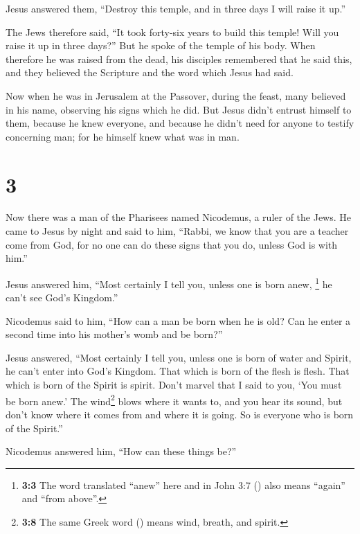  Jesus answered them, ``Destroy this temple, and in three
days I will raise it up.''

 The Jews therefore said, ``It took forty-six years to
build this temple! Will you raise it up in three days?'' 
But he spoke of the temple of his body.  When therefore
he was raised from the dead, his disciples remembered that he said this,
and they believed the Scripture and the word which Jesus had said.

 Now when he was in Jerusalem at the Passover, during the
feast, many believed in his name, observing his signs which he did.
 But Jesus didn't entrust himself to them, because he
knew everyone,  and because he didn't need for anyone to
testify concerning man; for he himself knew what was in man.

\hypertarget{section-2}{%
\section{3}\label{section-2}}

 Now there was a man of the Pharisees named Nicodemus, a
ruler of the Jews.  He came to Jesus by night and said to
him, ``Rabbi, we know that you are a teacher come from God, for no one
can do these signs that you do, unless God is with him.''

 Jesus answered him, ``Most certainly I tell you, unless
one is born anew, \footnote{\textbf{3:3} The word translated ``anew''
  here and in John 3:7 () also means ``again'' and ``from
  above''.} he can't see God's Kingdom.''

 Nicodemus said to him, ``How can a man be born when he is
old? Can he enter a second time into his mother's womb and be born?''

 Jesus answered, ``Most certainly I tell you, unless one
is born of water and Spirit, he can't enter into God's Kingdom.
 That which is born of the flesh is flesh. That which is
born of the Spirit is spirit.  Don't marvel that I said to
you, `You must be born anew.'  The wind\footnote{\textbf{3:8}
  The same Greek word () means wind, breath, and spirit.}
blows where it wants to, and you hear its sound, but don't know where it
comes from and where it is going. So is everyone who is born of the
Spirit.''

 Nicodemus answered him, ``How can these things be?''

